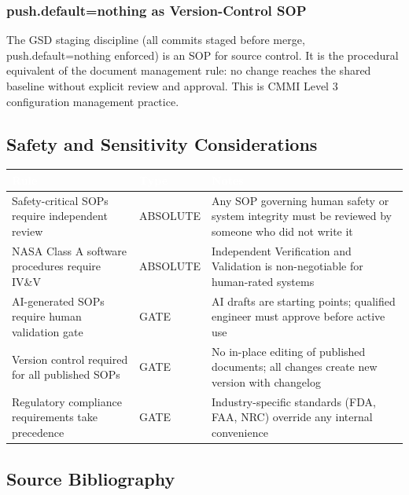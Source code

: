 \documentclass[11pt,letterpaper]{article}
\newcommand{\tableheader}[1]{\textbf{\sffamily\textcolor{white}{#1}}}
\begin{document}
\subsubsection{push.default=nothing as Version-Control SOP}

The GSD staging discipline (all commits staged before merge, push.default=nothing enforced) is an SOP for source control. It is the procedural equivalent of the document management rule: no change reaches the shared baseline without explicit review and approval. This is CMMI Level 3 configuration management practice.

\subsection{Safety and Sensitivity Considerations}

\begin{center}
\begin{tabularx}{\textwidth}{L{4cm}L{2cm}X}
\toprule
{}
\tableheader{Rule} & \tableheader{Type} & \tableheader{Notes} \\
\midrule
Safety-critical SOPs require independent review & ABSOLUTE & Any SOP governing human safety or system integrity must be reviewed by someone who did not write it \\
NASA Class A software procedures require IV\&V & ABSOLUTE & Independent Verification and Validation is non-negotiable for human-rated systems \\
AI-generated SOPs require human validation gate & GATE & AI drafts are starting points; qualified engineer must approve before active use \\
Version control required for all published SOPs & GATE & No in-place editing of published documents; all changes create new version with changelog \\
Regulatory compliance requirements take precedence & GATE & Industry-specific standards (FDA, FAA, NRC) override any internal convenience \\
\bottomrule
\end{tabularx}
\end{center}

\subsection{Source Bibliography}
\end{document}
